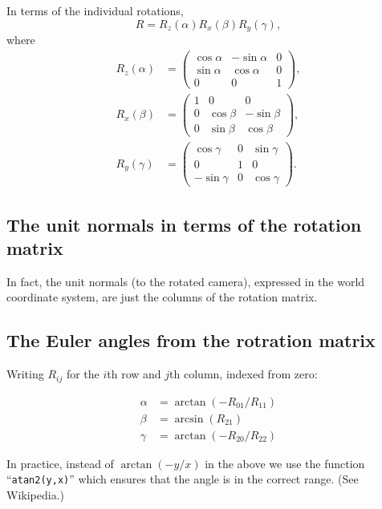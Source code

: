 \documentclass{article}
\begin{document}
In terms of the individual rotations,
\begin{equation}
  R = R_z(\alpha) R_x(\beta) R_y(\gamma), 
\end{equation}
where
\begin{equation}
  \begin{split}
    R_z(\alpha) &= 
    \left(\begin{matrix}
      \cos\alpha & -\sin\alpha & 0 \\
      \sin\alpha & \cos\alpha & 0 \\
      0 & 0 & 1
    \end{matrix}\right), \\
    R_x(\beta) &= 
    \left(\begin{matrix}
      1 & 0 & 0 \\
      0 & \cos\beta & -\sin\beta \\
      0 & \sin\beta & \cos\beta 
    \end{matrix}\right), \\
    R_y(\gamma) &= 
    \left(\begin{matrix}
      \cos\gamma & 0 & \sin\gamma \\
      0 & 1 & 0 \\
      -\sin\gamma & 0 & \cos\gamma 
    \end{matrix}\right).
  \end{split}
\end{equation}

\subsection*{The unit normals in terms of the rotation matrix}

In fact, the unit normals (to the rotated camera), expressed in the
world coordinate system, are just the columns of the rotation matrix.

\subsection*{The Euler angles from the rotration matrix}

Writing $R_{ij}$ for the $i$th row and $j$th column, indexed from zero:

\begin{equation}
  \begin{split}
    \alpha &= \arctan(-R_{01}/ R_{11}) \\
    \beta  &= \arcsin(R_{21}) \\
    \gamma &= \arctan(-R_{20}/ R_{22})
  \end{split}
\end{equation}

In practice, instead of $\arctan(-y/x)$ in the above we use the
function ``\texttt{atan2(y,x)}'' which ensures that the angle is in
the correct range. (See Wikipedia.)
\end{document}
